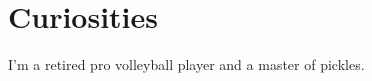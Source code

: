 \documentclass[]{plushcv}
\begin{document}
\begin{minipage}[t]{0.25\textwidth}


\section{Curiosities}
I'm a retired pro volleyball player and a master of pickles.






\end{minipage} 
\end{document}
